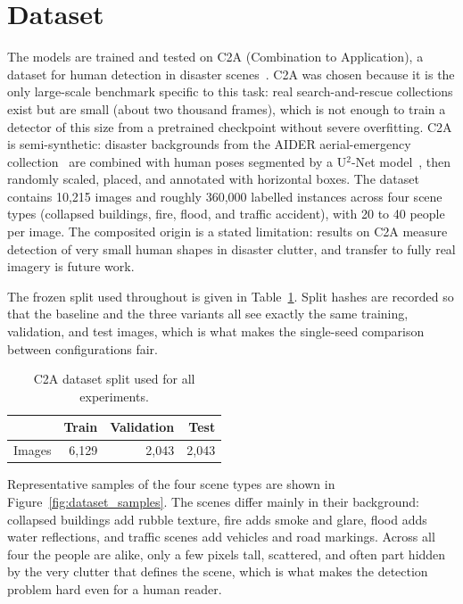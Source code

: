 \section{Dataset}
\label{sec:dataset}
The models are trained and tested on C2A (Combination to Application), a
dataset for human detection in disaster scenes~\cite{nihal2024c2a}. C2A was
chosen because it is the only large-scale benchmark specific to this task:
real search-and-rescue collections exist but are small (about two thousand
frames), which is not enough to train a detector of this size from a
pretrained checkpoint without severe overfitting. C2A is semi-synthetic:
disaster backgrounds from the AIDER aerial-emergency
collection~\cite{kyrkou2020aider} are combined with human poses segmented by
a U$^2$-Net model~\cite{qin2020u2net}, then randomly scaled, placed, and
annotated with horizontal boxes. The dataset contains 10{,}215 images and
roughly 360{,}000 labelled instances across four scene types (collapsed
buildings, fire, flood, and traffic accident), with 20 to 40 people per
image. The composited origin is a stated limitation: results on C2A measure
detection of very small human shapes in disaster clutter, and transfer to
fully real imagery is future work.

The frozen split used throughout is given in Table~\ref{tab:split}. Split
hashes are recorded so that the baseline and the three variants all see
exactly the same training, validation, and test images, which is what makes
the single-seed comparison between configurations fair.

\begin{table}[H]
  \centering
  \caption{C2A dataset split used for all experiments.}
  \label{tab:split}
  \begin{tabular}{@{}l r r r@{}}
    \toprule
    & Train & Validation & Test \\
    \midrule
    Images & 6{,}129 & 2{,}043 & 2{,}043 \\
    \bottomrule
  \end{tabular}
\end{table}

Representative samples of the four scene types are shown in
Figure~\ref{fig:dataset_samples}. The scenes differ mainly in their
background: collapsed buildings add rubble texture, fire adds smoke and glare,
flood adds water reflections, and traffic scenes add vehicles and road
markings. Across all four the people are alike, only a few pixels tall,
scattered, and often part hidden by the very clutter that defines the scene,
which is what makes the detection problem hard even for a human reader.

